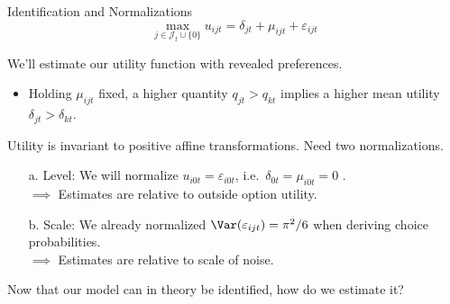 \documentclass[aspectratio=169,t,11pt,table]{beamer}
\begin{document}
\begin{frame}{Identification and Normalizations}
    \vspace{-\baselineskip}
    \begin{equation*}
        \max_{j \in \mathcal{J}_t \cup \{0\}} u_{ijt} = \delta_{jt} + \mu_{ijt} + \varepsilon_{ijt}
    \end{equation*}
    \vspace{-0.5\baselineskip}
    \begin{wideitemize}
        \item We'll estimate our utility function with \alert{revealed preferences}.
        \begin{itemize}
            \item Holding $\mu_{ijt}$ fixed, a higher quantity $q_{jt} > q_{kt}$ implies a higher mean utility $\delta_{jt} > \delta_{kt}$.
        \end{itemize}
        \pause
        \item Utility is invariant to positive affine transformations. Need two normalizations.
        \pause
        \begin{enumerate}
            \item[a.] \alert{Level}: We will normalize $u_{i0t} = \varepsilon_{i0t}$, i.e.\ $\delta_{0t} = \mu_{i0t} = 0$ .\\ $\implies$ Estimates are relative to outside option utility.
            \pause
            \item[b.] \alert{Scale}: We already normalized $\Var(\varepsilon_{ijt}) = \pi^2 / 6$ when deriving choice probabilities. \\ $\implies$ Estimates are relative to scale of noise.
        \end{enumerate}
        \pause
        \item Now that our model can in theory be identified, how do we estimate it?
    \end{wideitemize}
\end{frame}
\end{document}
